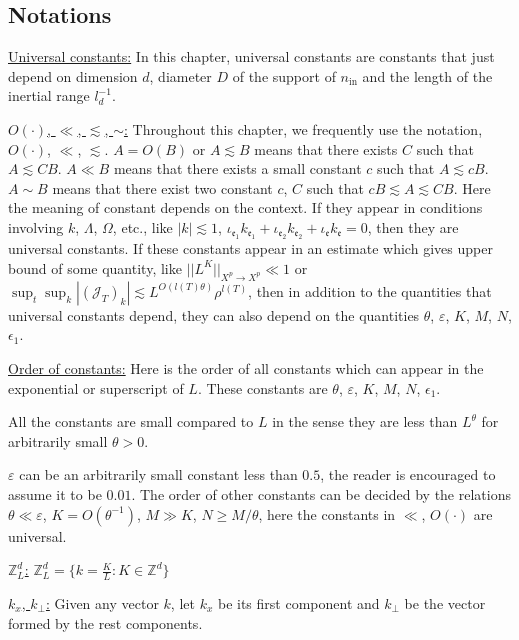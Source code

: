  
\subsection{Notations}\label{sec.notat} 

\underline{Universal constants:} In this chapter, universal constants are constants that just depend on dimension $d$, diameter $D$ of the support of $n_{\text{in}}$ and the length of the inertial range $l^{-1}_d$. 

\underline{$O(\cdot)$, $\ll$, $\lesssim$, $\sim$:} Throughout this chapter, we frequently use the notation, $O(\cdot)$, $\ll$, $\lesssim$. $A=O(B)$ or $A\lesssim B$ means that there exists $C$ such that $A\lesssim CB$. $A\ll B$ means that there exists a small constant $c$ such that $A\lesssim cB$. $A\sim B$ means that there exist two constant $c$, $C$ such that $cB\lesssim A\lesssim CB$. Here the meaning of constant depends on the context. If they appear in conditions involving $k$, $\Lambda$, $\Omega$, etc., like $|k|\lesssim 1$, $\iota_{\mathfrak{e}_1}k_{\mathfrak{e}_1}+\iota_{\mathfrak{e}_2}k_{\mathfrak{e}_2}+\iota_{\mathfrak{e}}k_{\mathfrak{e}}=0$, then they are universal constants. If these constants appear in an estimate which gives upper bound of some quantity, like $||L^K||_{X^p\rightarrow X^p}\ll 1$ or $\sup_t\sup_k  |(\mathcal{J}_T)_k|\lesssim L^{O(l(T)\theta)} \rho^{l(T)}$, then in addition to the quantities that universal constants depend, they can also depend on the quantities $\theta$, $\varepsilon$, $K$, $M$, $N$, $\epsilon_1$.

\underline{Order of constants:} Here is the order of all constants which can appear in the exponential or superscript of $L$. These constants are $\theta$, $\varepsilon$, $K$, $M$, $N$, $\epsilon_1$.%

All the constants are small compared to $L$ in the sense they are less than $L^{\theta}$ for arbitrarily small $\theta>0$.

$\varepsilon$ can be an arbitrarily small constant less than $0.5$, the reader is encouraged to assume it to be $0.01$. The order of other constants can be decided by the relations $\theta\ll \varepsilon$, $K=O(\theta^{-1})$, $M\gg K$, $N\ge M/\theta$, here the constants in $\ll$, $O(\cdot)$ are universal. 

\underline{$\mathbb{Z}_L^d$:} $\mathbb{Z}_L^d= \{k=\frac{K}{L}:K\in \mathbb{Z}^d\}$

\underline{$k_x$, $k_{\perp}$:} Given any vector $k$, let $k_x$ be its first component and $k_{\perp}$ be the vector formed by the rest components. 

